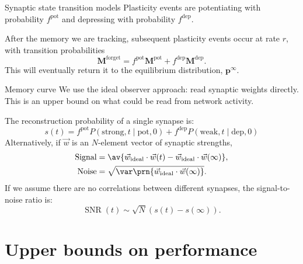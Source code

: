 \documentclass[final,hyperref={pdfpagelabels=false,bookmarks=false}]{beamer}
\DeclareMathOperator{\SNR}{SNR}
\newcommand{\pot}{^\text{pot}}
\newcommand{\dep}{^\text{dep}}
\newcommand{\frg}{^\text{forget}}
\newcommand{\eq}{\mathbf{p}^\infty}
\newcommand{\W}{\vec{w}}
\newcommand{\M}{\mathbf{M}}
\begin{document}
\begin{frame}{}
\begin{columns}[t]
\begin{column}{0.415\linewidth}
\begin{block}{Synaptic state transition models}
 \vp Plasticity events are potentiating with probability $f\pot$ and depressing with probability $f\dep$.

 \vp After the memory we are tracking, subsequent plasticity events occur at rate $r$, with transition probabilities
 \begin{equation*}
   \M\frg = f\pot\M\pot + f\dep\M\dep.
 \end{equation*}
 This will eventually return it to the equilibrium distribution, $\eq$.

%
\end{block}


\begin{block}{Memory curve}
%
 We use the ideal observer approach: read synaptic weights directly.
 This is an upper bound on what could be read from network activity.

 The reconstruction probability of a single synapse is:
 \begin{equation*}
   s(t) = f\pot P(\text{strong},t\mid\text{pot},0) + f\dep P(\text{weak},t\mid\text{dep},0)
 \end{equation*}
 Alternatively, if $\W$ is an $N$-element vector of synaptic strengths,
 \begin{equation*}
   \begin{aligned}
     \text{Signal} &= \av{\W_\text{ideal} \cdot \W(t) -  \W_\text{ideal} \cdot \W(\infty)}, \\
     \text{Noise} &= \sqrt{\var\prn{\W_\text{ideal} \cdot \W(\infty)}}.
   \end{aligned}
 \end{equation*}
 If we assume there are no correlations between different synapses, the signal-to-noise ratio is:
 \begin{equation*}
   \SNR(t) \sim \sqrt{N}(s(t)-s(\infty)).
 \end{equation*}
%
\end{block}


\section{Upper bounds on performance}



\end{column}
\end{columns}
\end{frame}
\end{document}
